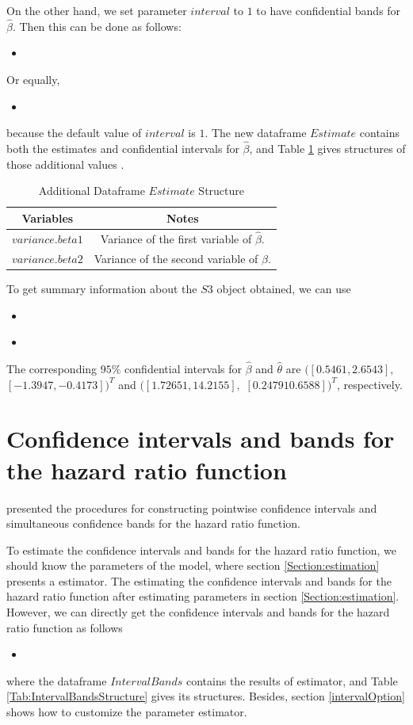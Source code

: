 \documentclass[12pt]{article}
\newcommand{\insertcode}[2]{\begin{itemize}\item[]\end{itemize}} %
\begin{document}
On the other hand, we set parameter $interval$ to $1$  to have confidential bands for $\hat{\beta}$.
Then this can be done as follows:
\insertcode{"Scripts/code8.pl"}{Performing estimator with confidential bands.}
Or equally,
\insertcode{"Scripts/code9.pl"}{Performing estimator with confidential bands.}
because the default value of $interval$ is $1$.
The new dataframe $Estimate$ contains both the estimates and confidential intervals for $\hat{\beta}$, and Table \ref{Tab:AdditionalEstimateStructure} gives structures of those additional values .
\begin{table}[!h]
\renewcommand{\arraystretch}{1.3}
\caption{Additional Dataframe $Estimate$ Structure} \label{Tab:AdditionalEstimateStructure} \centering
\begin{tabular}{|c||c|}
  \hline
  Variables & Notes  \\
  \hline
  $variance.beta1$ & Variance of the first variable of $\hat{\beta}$. \\
  $variance.beta2$ & Variance of the second variable of $\hat{\beta}$. \\
  \hline
\end{tabular}
\end{table}

To get summary information about the $S3$ object obtained, we can use
\insertcode{"Scripts/code11.pl"}{Summarizing estimates' results with confidential bands.}
\insertcode{"Scripts/result11.pl"}{Results of scripts.}

The corresponding $95\%$ confidential intervals for $\hat{\beta}$ and $\hat{\theta}$ are  $([0.5461,2.6543],$ $[-1.3947,-0.4173])^T$ and $([1.72651,14.2155],$ $[0.24791  0.6588])^T$, respectively.


\section{Confidence intervals and bands for the hazard ratio function}\label{Section.Intervals}
 \cite{yang2011estimation} presented the procedures for constructing pointwise confidence intervals and simultaneous confidence bands for the hazard ratio function.

 To estimate the confidence intervals and bands for the hazard ratio function, we should know the parameters of the model,  where section \ref{Section:estimation} presents a estimator.
The estimating the confidence intervals and bands for the hazard ratio function after estimating parameters in section \ref{Section:estimation}. However, we can directly get the confidence intervals and bands for the hazard ratio function as follows
\insertcode{"Scripts/code14.pl"}{Performing confidence intervals and bands estimation.}
where the dataframe $IntervalBands$ contains the results of estimator, and Table \ref{Tab:IntervalBandsStructure} gives its structures. Besides, section \ref{intervalOption} shows how to customize the parameter estimator.
\end{document}
